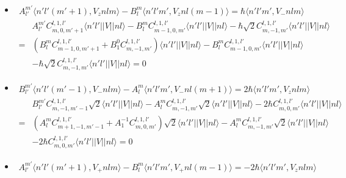 \begin{enumerate}
\begin{itemize}
\begin{align*}
        -\hbar \sqrt{2}C^{l,1,l'}_{m,1,m'}
        \langle n'l'||V||nl\rangle\\
        =&0
    \end{align*}
    \item 
     \begin{align*}
        A^{m'}_{l'}\langle n'l'(m'+1),V_znlm\rangle 
        -B^m_l\langle n'l'm',V_znl(m-1)\rangle=
        \hbar\langle n'l'm', V_-nlm\rangle
    \end{align*}
    \begin{align*}
        &A^{m'}_{l'}
        C^{l,1,l'}_{m,0,m'+1}
        \langle n'l'||V||nl\rangle
        -B^m_l 
        C^{l,1,l'}_{m-1,0,m'}
        \langle n'l'||V||nl\rangle
        -\hbar \sqrt{2}C^{l,1,l'}_{m,-1,m'}
        \langle n'l'||V||nl\rangle\\
        =&
        (B^m_lC^{l,1,l'}_{m-1,0,m'+1}+B^0_1C^{l,1,l'}_{m,-1,m'})
        \langle n'l'||V||nl\rangle
        -B^m_l 
        C^{l,1,l'}_{m-1,0,m'}
        \langle n'l'||V||nl\rangle\\
        &-\hbar \sqrt{2}C^{l,1,l'}_{m,-1,m'}
        \langle n'l'||V||nl\rangle
        =0
    \end{align*}
    \item 
    \begin{align*}
        B^{m'}_{l'}\langle n'l'(m'-1),V_-nlm\rangle 
        -A^m_l\langle n'l'm',V_-nl(m+1)\rangle=
        2\hbar\langle n'l'm', V_znlm\rangle
    \end{align*}
    \begin{align*}
        &B^{m'}_{l'}
        C^{l,1,l'}_{m,-1,m'-1}
        \sqrt{2}\langle n'l'||V||nl\rangle
        -A^m_l 
        C^{l,1,l'}_{m,-1,m'}\sqrt{2}
        \langle n'l'||V||nl\rangle
        -2\hbar C^{l,1,l'}_{m,0,m'}
        \langle n'l'||V||nl\rangle\\
        =&
        (A^m_lC^{l,1,l'}_{m+1,-1,m'-1}+A^{-1}_1C^{l,1,l'}_{m,0,m'})
        \sqrt{2}\langle n'l'||V||nl\rangle
        -A^m_l 
        C^{l,1,l'}_{m,-1,m'}\sqrt{2}
        \langle n'l'||V||nl\rangle\\
        &-2\hbar C^{l,1,l'}_{m,0,m'}
        \langle n'l'||V||nl\rangle=0
    \end{align*}
    \item 
    \begin{align*}
        A^{m'}_{l'}\langle n'l'(m'+1),V_+nlm\rangle 
        -B^m_l\langle n'l'm',V_+nl(m-1)\rangle=
        -2\hbar\langle n'l'm', V_znlm\rangle
    \end{align*}
    \begin{align*}

\end{align*}
\end{itemize}
\end{enumerate}
